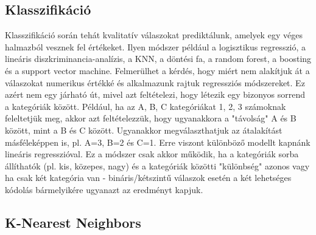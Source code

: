 \documentclass[12pt]{article}
\theoremstyle{plain}
\begin{document}
\subsection{Klasszifikáció}


Klasszifikáció során tehát kvalitatív válaszokat prediktálunk, amelyek egy véges halmazból vesznek fel értékeket. Ilyen módszer például a logisztikus regresszió, a lineáris diszkriminancia-analízis, a KNN, a döntési fa, a random forest, a boosting és a support vector machine. Felmerülhet a kérdés, hogy miért nem alakítjuk át a válaszokat numerikus értékké és alkalmazunk rajtuk regressziós módszereket. Ez azért nem egy járható út, mivel azt feltételezi, hogy létezik egy bizonyos sorrend a kategóriák között. Például, ha az A, B, C kategóriákat 1, 2, 3 számoknak feleltetjük meg, akkor azt feltételezzük, hogy ugyanakkora a "távolság" A és B között, mint a B és C között. Ugyanakkor megválaszthatjuk az átalakítást másféleképpen is, pl.  A=3, B=2 és C=1. Erre viszont különböző modellt kapnánk lineáris regresszióval. Ez a módszer csak akkor működik, ha a kategóriák sorba állíthatók (pl. kis, közepes, nagy) és a kategóriák közötti "különbség" azonos vagy ha csak két kategória van - bináris/kétszintű válaszok esetén a két lehetséges kódolás bármelyikére ugyanazt az eredményt kapjuk. 


\subsection{K-Nearest Neighbors}
\end{document}
